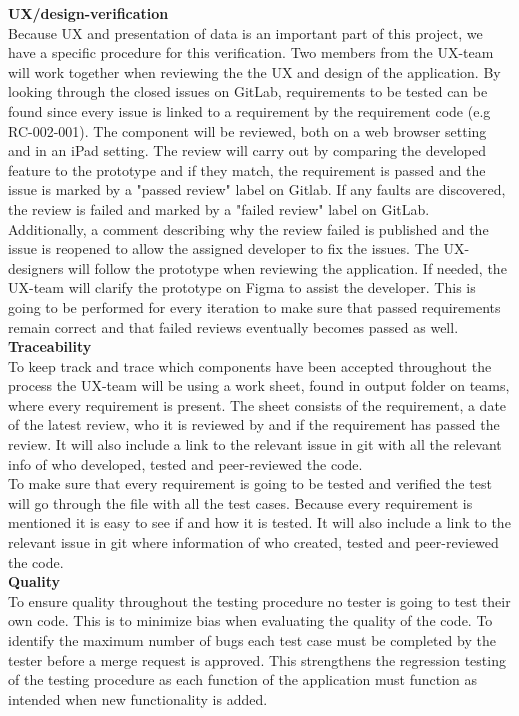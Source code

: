 \noindent \textbf{UX/design-verification}\\
Because UX and presentation of data is an important part of this project, we have a specific procedure for this verification. Two members from the UX-team will work together when reviewing the the UX and design of the application. By looking through the closed issues on GitLab, requirements to be tested can be found since every issue is linked to a requirement by the requirement code (e.g RC-002-001). The component will be reviewed, both on a web browser setting and in an iPad setting. The review will carry out by comparing the developed feature to the prototype and if they match, the requirement is passed and the issue is marked by a "passed review" label on Gitlab. If any faults are discovered, the review is failed and marked by a "failed review" label on GitLab. Additionally, a comment describing why the review failed is published and the issue is reopened to allow the assigned developer to fix the issues. The UX-designers will follow the prototype when reviewing the application. If needed, the UX-team will clarify the prototype on Figma to assist the developer. This is going to be performed for every iteration to make sure that passed requirements remain correct and that failed reviews eventually becomes passed as well. \\ 

\noindent\textbf{Traceability}\\
To keep track and trace which components have been accepted throughout the process the UX-team will be using a work sheet, found in output folder on teams, where every requirement is present. The sheet consists of the requirement, a date of the latest review, who it is reviewed by and if the requirement has passed the review. It will also include a link to the relevant issue in git with all the relevant info of who developed, tested and peer-reviewed the code.\\

\noindent To make sure that every requirement is going to be tested and verified the test will go through the file with all the test cases. Because every requirement is mentioned it is easy to see if and how it is tested. It will also include a link to the relevant issue in git where information of who created, tested and peer-reviewed the code.\\  

\noindent\textbf{Quality}\\
To ensure quality throughout the testing procedure no tester is going to test their own code. This is to minimize bias when evaluating the quality of the code. To identify the maximum number of bugs each test case must be completed by the tester before a merge request is approved. This strengthens the regression testing of the testing procedure as each function of the application must function as intended when new functionality is added. \\

